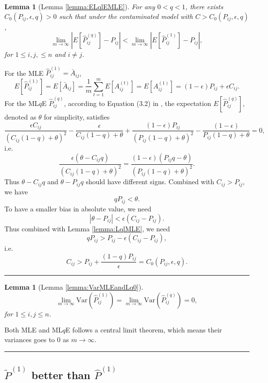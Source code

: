 \documentclass[a4paper]{article}
\newenvironment{proof}{{\bf Proof:  }}{\hfill\rule{2mm}{2mm}}
\newtheorem{lemma}[fact]{Lemma}
\begin{document}
\begin{lemma} [Lemma \ref{lemma:ELqlEMLE}]
For any $0 < q < 1$, there exists $C_0(P_{ij}, \epsilon, q) > 0$ such that under the contaminated model with $C > C_0(P_{ij}, \epsilon, q)$,
\[
	\lim_{m \to \infty} \left| E[\hat{P}^{(q)}_{ij}] - P_{ij} \right| < 
    \lim_{m \to \infty} \left| E[\hat{P}^{(1)}_{ij}] - P_{ij} \right|,
\]
for $1 \le i, j, \le n$ and $i \ne j$.
\end{lemma}
\begin{proof}
For the MLE $\hat{P}^{(1)}_{ij} = \bar{A}_{ij}$,
\[
	E[\hat{P}^{(1)}_{ij}] = E[\bar{A}_{ij}]
    = \frac{1}{m} \sum_{t = 1}^m E[A_{ij}^{(t)}]
    = E[A_{ij}^{(1)}]
    = (1-\epsilon) P_{ij} + \epsilon C_{ij}.
\]
For the ML$q$E $\hat{P}^{(q)}_{ij}$, according to Equation (3.2) in \cite{ferrari2010}, the expectation $E[\hat{P}^{(q)}_{ij}]$, denoted as $\theta$ for simplicity, satisfies
\[
\frac{\epsilon C_{ij}}{(C_{ij}(1-q) + \theta)^2} - \frac{\epsilon}{C_{ij}(1-q) + \theta}
+\frac{(1-\epsilon) P_{ij}}{(P_{ij}(1-q) + \theta)^2} - \frac{(1-\epsilon)}{P_{ij}(1-q) + \theta}
= 0,
\]
i.e.
\[
\frac{\epsilon (\theta - C_{ij}q)}{(C_{ij}(1-q) + \theta)^2} =
\frac{(1-\epsilon) (P_{ij} q - \theta)}{(P_{ij}(1-q) + \theta)^2}.
\]
Thus $\theta - C_{ij} q$ and $\theta - P_{ij} q$ should have different signs. Combined with $C_{ij} > P_{ij}$, we have
\[
q P_{ij} < \theta.
\]
To have a smaller bias in absolute value, we need
\[
|\theta - P_{ij}| < \epsilon (C_{ij} - P_{ij}).
\]
Thus combined with Lemma \ref{lemma:LqlMLE}, we need
\[
q P_{ij} > P_{ij} - \epsilon(C_{ij} - P_{ij}),
\]
i.e.
\[
C_{ij} > P_{ij} + \frac{(1-q) P_{ij}}{\epsilon} = C_0(P_{ij}, \epsilon, q).
\]
\end{proof}



\begin{lemma} [Lemma \ref{lemma:VarMLEandLq0}]
\[
	\lim_{m \to \infty} \mathrm{Var}(\hat{P}^{(1)}_{ij})
    = \lim_{m \to \infty} \mathrm{Var}(\hat{P}^{(q)}_{ij}) = 0,
\]
for $1 \le i, j \le n$.
\end{lemma}
\begin{proof}
Both MLE and ML$q$E follows a central limit theorem, which means their variances goes to 0 as $m \to \infty$.
\end{proof}










\subsection{$\widetilde{P}^{(1)}$ better than $\hat{P}^{(1)}$}
\end{document}
